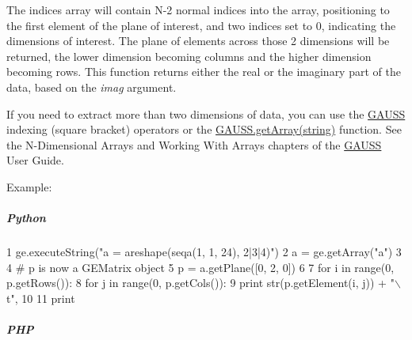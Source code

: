 The indices array will contain N-\/2 normal indices into the array, positioning to the first element of the plane of interest, and two indices set to 0, indicating the dimensions of interest. The plane of elements across those 2 dimensions will be returned, the lower dimension becoming columns and the higher dimension becoming rows. This function returns either the real or the imaginary part of the data, based on the {\itshape imag} argument.

If you need to extract more than two dimensions of data, you can use the \hyperlink{class_g_a_u_s_s}{G\-A\-U\-S\-S} indexing (square bracket) operators or the \hyperlink{class_g_a_u_s_s_a4016aa13feb5c5648556dcca73caf030}{G\-A\-U\-S\-S.\-get\-Array(string)} function. See the N-\/\-Dimensional Arrays and Working With Arrays chapters of the \hyperlink{class_g_a_u_s_s}{G\-A\-U\-S\-S} User Guide.

Example\-:

\subparagraph*{Python}


\begin{DoxyCode}
1 ge.executeString(\textcolor{stringliteral}{"a = areshape(seqa(1, 1, 24), 2|3|4)"})
2 a = ge.getArray(\textcolor{stringliteral}{"a"})
3 
4 \textcolor{comment}{# p is now a GEMatrix object}
5 p = a.getPlane([0, 2, 0])
6 
7 \textcolor{keywordflow}{for} i \textcolor{keywordflow}{in} range(0, p.getRows()):
8     \textcolor{keywordflow}{for} j \textcolor{keywordflow}{in} range(0, p.getCols()):
9         \textcolor{keywordflow}{print} str(p.getElement(i, j)) + \textcolor{stringliteral}{"\(\backslash\)t"},
10 
11     \textcolor{keywordflow}{print}
\end{DoxyCode}


\subparagraph*{P\-H\-P}


